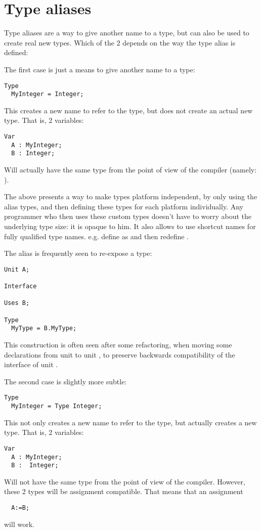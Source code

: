 \section{Type aliases}
Type aliases are a way to give another name to a type, but can also be used
to create real new types. Which of the 2 depends on the way the type alias
is defined:

The first case is just a means to give another name to a type:
\begin{verbatim}
Type
  MyInteger = Integer;
\end{verbatim}
This creates a new name to refer to the  type, but does not create an
actual new type. That is, 2 variables:
\begin{verbatim}
Var
  A : MyInteger;
  B : Integer;
\end{verbatim}
Will actually have the same type from the point of view of the compiler
(namely: ).

The above presents a way to make types platform independent, by only using the
alias types, and then defining these types for each platform individually. 
Any programmer who then uses these custom types doesn't have to worry
about the underlying type size: it is opaque to him. It also allows to use shortcut names 
for fully qualified type names. e.g. define  as
 and then redefine .

The alias is frequently seen to re-expose a type:
\begin{verbatim}
Unit A;

Interface

Uses B;

Type
  MyType = B.MyType;
\end{verbatim}
This construction is often seen after some refactoring, when moving some
declarations from unit  to unit , to preserve backwards compatibility 
of the interface of unit .

The second case is slightly more subtle:
\begin{verbatim}
Type
  MyInteger = Type Integer;
\end{verbatim}
This not only creates a new name to refer to the  type, but
actually creates a new type. That is, 2 variables:
\begin{verbatim}
Var
  A : MyInteger;
  B :  Integer;
\end{verbatim}
Will not have the same type from the point of view of the compiler. However,
these 2 types will be assignment compatible.
That means that an assignment
\begin{verbatim}
  A:=B;
\end{verbatim}
will work.

